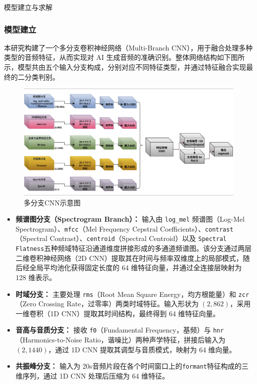 \documentclass[aspectratio=169]{beamer}
\begin{document}
\begin{frame}{模型建立与求解}
\subsubsection{模型建立}

本研究构建了一个多分支卷积神经网络（Multi-Branch CNN），用于融合处理多种类型的音频特征，从而实现对 AI 生成音频的准确识别。整体网络结构如下图所示，模型共由五个输入分支构成，分别对应不同特征类型，并通过特征融合实现最终的二分类判别。

\begin{figure}[h]
    \centering
    \includegraphics[width=0.75\linewidth]{images_in_paper/model.png}
    \caption{多分支CNN示意图}
    \label{fig:model}
\end{figure}

\begin{itemize}
 
  \item \textbf{频谱图分支（Spectrogram Branch）：} 输入由 \texttt{log\_mel} 频谱图（Log-Mel Spectrogram）、\texttt{mfcc}（Mel Frequency Cepstral Coefficients）、\texttt{contrast}（Spectral Contrast）、\texttt{centroid}（Spectral Centroid）以及 \texttt{Spectral Flatness}五种频域特征沿通道维度拼接形成的多通道频谱图。该分支通过两层二维卷积神经网络（2D CNN）提取其在时间与频率双维度上的局部模式，随后经全局平均池化获得固定长度的 64 维特征向量，并通过全连接层映射为 128 维表示。

    \item \textbf{时域分支：} 主要处理 \texttt{rms}（Root Mean Square Energy，均方根能量）和 \texttt{zcr}（Zero Crossing Rate，过零率）两类时域特征。输入形状为 $(2, 862)$，采用一维卷积（1D CNN）提取其时间结构，最终得到 64 维特征向量。
      
    \item \textbf{音高与音质分支：} 接收 \texttt{f0}（Fundamental Frequency，基频）与 \texttt{hnr}（Harmonics-to-Noise Ratio，谐噪比）两种声学特征，拼接后输入为 $(2, 1440)$，通过 1D CNN 提取其调型与音质模式，映射为 64 维向量。
      
    \item \textbf{共振峰分支：} 输入为 20s音频片段在各个时间窗口上的\texttt{formant}特征构成的三维序列，通过 1D CNN 处理后压缩为 64 维特征。
      

\end{itemize}
\end{frame}
\end{document}
